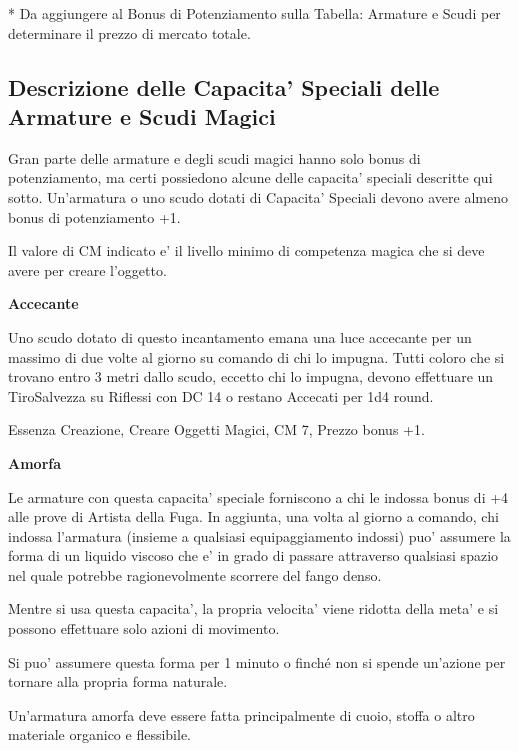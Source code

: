 \documentclass[a4paper,11pt,twoside,openany]{book}
\begin{document}
{		{*} Da aggiungere al Bonus di Potenziamento sulla Tabella: Armature
		e Scudi per determinare il prezzo di mercato totale.
		
		
		
		\subsection{Descrizione delle Capacita' Speciali delle Armature e Scudi Magici}
		
		\label{descrizione-delle-capacita-speciali-delle-armature-e-scudi-magici}
		
		Gran parte delle armature e degli scudi magici hanno solo bonus di potenziamento, ma certi possiedono alcune delle capacita' speciali descritte qui sotto. Un'armatura o uno scudo dotati di Capacita' Speciali devono avere almeno bonus di potenziamento +1.
		
		Il valore di CM indicato e' il livello minimo di competenza magica che si deve avere per creare l'oggetto.
		
		\textbf{Accecante}
		
		Uno scudo dotato di questo incantamento emana una luce accecante per un massimo di due volte al giorno su comando di chi lo impugna. Tutti coloro che si trovano entro 3 metri dallo scudo, eccetto chi lo impugna, devono effettuare un TiroSalvezza su Riflessi con DC 14 o restano Accecati per 1d4 round.
		
		Essenza Creazione, Creare Oggetti Magici, CM 7, Prezzo bonus +1.
		
		\textbf{Amorfa}
		
		Le armature con questa capacita' speciale forniscono a chi le indossa bonus di +4 alle prove di Artista della Fuga. In aggiunta, una volta al giorno a comando, chi indossa l'armatura (insieme a qualsiasi equipaggiamento indossi) puo' assumere la forma di un liquido viscoso che e' in grado di passare attraverso qualsiasi spazio nel quale potrebbe ragionevolmente scorrere del fango denso.
		
		Mentre si usa questa capacita', la propria velocita' viene ridotta della meta' e si possono effettuare solo azioni di movimento.
		
		Si puo' assumere questa forma per 1 minuto o finché non si spende un'azione per tornare alla propria forma naturale.
		
		Un'armatura amorfa deve essere fatta principalmente di cuoio, stoffa o altro materiale organico e flessibile.
		
}
\end{document}
